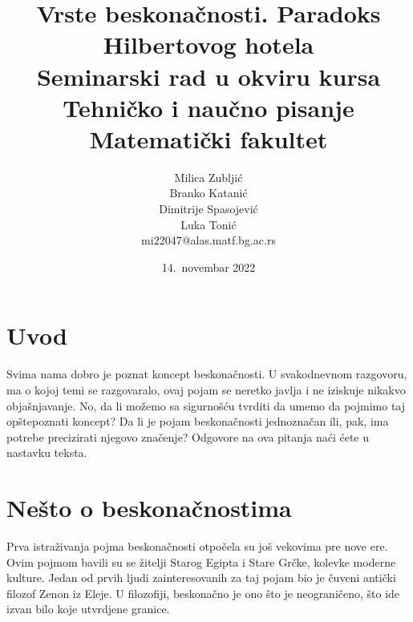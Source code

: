 \documentclass[a4paper]{article}
\begin{document}
\title{Vrste beskonačnosti. Paradoks Hilbertovog hotela\\ \small{Seminarski rad u okviru kursa\\Tehničko i naučno pisanje\\ Matematički fakultet}}

\author{Milica Zubljić\\ Branko Katanić\\ Dimitrije Spasojević\\ Luka Tonić\\ mi22047@alas.matf.bg.ac.rs}
\date{14.~novembar 2022}
\maketitle


\newpage

\tableofcontents %

\newpage

\section{Uvod}
\label{poglavlje:uvod}

Svima nama dobro je poznat koncept beskonačnosti. U svakodnevnom razgovoru, ma o kojoj temi se razgovaralo, ovaj pojam se neretko javlja i ne iziskuje nikakvo objašnjavanje. No, da li možemo sa sigurnošću tvrditi da umemo da pojmimo taj opštepoznati koncept? Da li je pojam beskonačnosti jednoznačan ili, pak, ima potrebe precizirati njegovo značenje? Odgovore na ova pitanja naći ćete u nastavku teksta.

\section{Nešto o beskonačnostima}
\label{poglavlje:Nešto o beskonačnostima}

Prva istraživanja pojma beskonačnosti otpočela su još vekovima pre nove ere. Ovim pojmom bavili su se žitelji Starog Egipta i Stare Grčke, kolevke moderne kulture. Jedan od prvih ljudi zainteresovanih za taj pojam bio je čuveni antički filozof Zenon iz Eleje. \cite{Zenon} U filozofiji, beskonačno je ono što je neograničeno, što ide izvan bilo koje utvrdjene granice\cite{weyl2013levels}.\\
\end{document}
